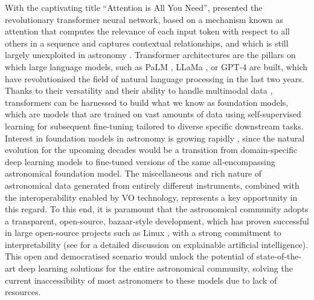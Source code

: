 With the captivating title ``Attention is All You Need'', \citet{vaswani2017} presented the revolutionary transformer neural network, based on a mechanism known as attention that computes the relevance of each input token with respect to all others in a sequence and captures contextual relationships, and which is still largely unexploited in astronomy \citep{astromer,atat}. Transformer architectures are the pillars on which large language models, such as PaLM \citep{palm}, LLaMa \citep{llama}, or GPT-4 \citep{gpt4} are built, which have revolutionised the field of natural language processing in the last two years. Thanks to their versatility and their ability to handle multimodal data \citep{reed2022}, transformers can be harnessed to build what we know as foundation models, which are models that are trained on vast amounts of data using self-supervised learning for subsequent fine-tuning tailored to diverse specific downstream tasks. Interest in foundation models in astronomy is growing rapidly \citep{astrollama,rozanski2023,leung2024,parker2024}, since the natural evolution for the upcoming decades would be a transition from domain-specific deep learning models to fine-tuned versions of the same all-encompassing astronomical foundation model. The miscellaneous and rich nature of astronomical data generated from entirely different instruments, combined with the interoperability enabled by VO technology, represents a key opportunity in this regard. To this end, it is paramount that the astronomical community adopts a transparent, open-source, bazaar-style development, which has proven successful in large open-source projects such as Linux \citep{raymond2001}, with a strong commitment to interpretability (see \citet{ras2020} for a detailed discussion on explainable artificial intelligence). This open and democratised scenario would unlock the potential of state-of-the-art deep learning solutions for the entire astronomical community, solving the current inaccessibility of most astronomers to these models due to lack of resources.

